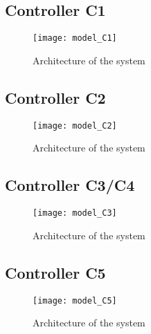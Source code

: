 \subsection*{Controller C1}
\begin{figure}[h]
\center
\texttt{[image: model\_C1]}
\caption{Architecture of the system}
\label{fig:controller_C1}
\end{figure}



\subsection*{Controller C2}
\begin{figure}[h]
\center
\texttt{[image: model\_C2]}
\caption{Architecture of the system}
\label{fig:controller_C2}
\end{figure}



\subsection*{Controller C3/C4}
\begin{figure}[h]
\center
\texttt{[image: model\_C3]}
\caption{Architecture of the system}
\label{fig:controller_C3}
\end{figure}


\subsection*{Controller C5}
\begin{figure}[h]
\center
\texttt{[image: model\_C5]}
\caption{Architecture of the system}
\label{fig:controller_C5}
\end{figure}

